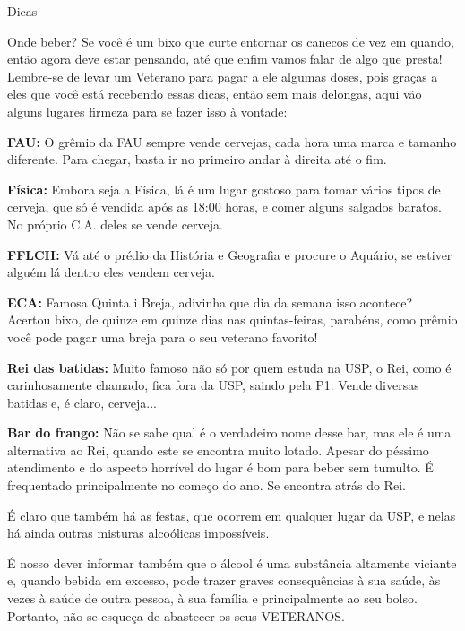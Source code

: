 \begin{secao}{Dicas}
\begin{subsecao}{Onde beber?}
Se você é um bixo que curte entornar os canecos de vez em quando, então agora
deve estar pensando, até que enfim vamos falar de algo que presta! Lembre-se de
levar um Veterano para pagar a ele algumas doses, pois graças a eles que você
está recebendo essas dicas, então sem mais delongas, aqui vão alguns lugares
firmeza para se fazer isso à vontade:

{\bf FAU:} O grêmio da FAU sempre vende cervejas, cada hora uma marca e tamanho diferente. Para chegar, basta ir no primeiro andar à direita até o fim.

{\bf Física:} Embora seja a Física, lá é um lugar gostoso para tomar vários
tipos de cerveja, que só é vendida após as 18:00 horas, e comer alguns
salgados baratos. No próprio C.A. deles se vende cerveja.

{\bf FFLCH:} Vá até o prédio da História e Geografia e procure o Aquário, se estiver alguém lá dentro eles vendem cerveja.

{\bf ECA:} Famosa Quinta i Breja, adivinha que dia da semana isso acontece?
Acertou bixo, de quinze em quinze dias nas quintas-feiras, parabéns, como
prêmio você pode pagar uma breja para o seu veterano favorito!

{\bf Rei das batidas:} Muito famoso não só por quem estuda na USP, o Rei,
como é carinhosamente chamado, fica fora da USP, saindo pela P1. Vende
diversas batidas e, é claro, cerveja...

{\bf Bar do frango:} Não se sabe qual é o verdadeiro nome desse bar, mas ele é
uma alternativa ao Rei, quando este se encontra muito lotado. Apesar do péssimo atendimento e do aspecto horrível do lugar é bom para beber sem
tumulto. É frequentado principalmente no começo do ano. Se encontra atrás do
Rei.

É claro que também há as festas, que ocorrem em qualquer lugar da USP, e nelas
há ainda outras misturas alcoólicas impossíveis.

É nosso dever informar também que o álcool é uma substância altamente viciante
e, quando bebida em excesso, pode trazer graves consequências à sua saúde, às
vezes à saúde de outra pessoa, à sua família e principalmente ao seu bolso.
Portanto, não se esqueça de abastecer os seus VETERANOS.


\end{subsecao}
\end{secao}
